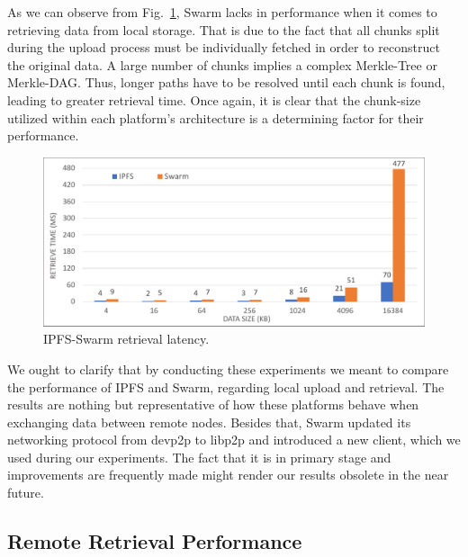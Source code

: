 As we can observe from Fig.~\ref{fig: ipfs_swarm_retrieve}, Swarm lacks in performance when it comes to retrieving data from local storage. That is due to the fact that all chunks split during the upload process must be individually fetched in order to reconstruct the original data. A large number of chunks implies a complex Merkle-Tree or Merkle-DAG. Thus, longer paths have to be resolved until each chunk is found, leading to greater retrieval time. Once again, it is clear that the chunk-size utilized within each platform’s architecture is a determining factor for their performance.

\begin{figure}[htbp]
\centerline{\includegraphics[width=\textwidth]{figs/ipfs_swarm_retrieve.pdf}}
\caption{IPFS-Swarm retrieval latency.}
\label{fig: ipfs_swarm_retrieve}
\end{figure}
\setlength{\belowcaptionskip}{-10pt}

We ought to clarify that by conducting these experiments we meant to compare the performance of IPFS and Swarm, regarding local upload and retrieval. The results are nothing but representative of how these platforms behave when exchanging data between remote nodes. Besides that, Swarm updated its networking protocol from devp2p to libp2p and introduced a new client, which we used during our experiments. The fact that it is in primary stage and improvements are frequently made might render our results obsolete in the near future.
\subsection{Remote Retrieval Performance}\label{subsection:evaluation_remote}


